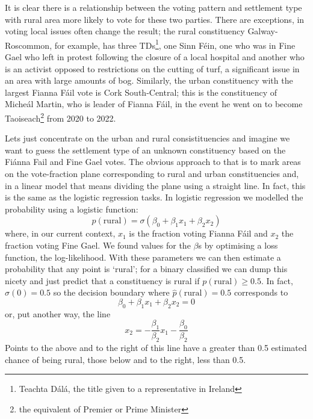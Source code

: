 \documentclass[12pt]{article}
\begin{document}
It is clear there is a relationship between the voting pattern and
settlement type with rural area more likely to vote for these two
parties. There are exceptions, in voting local issues often change the
result; the rural constituency Galway-Roscommon, for example, has
three TDs\footnote{Teachta D\'{a}l\'{a}, the title given to a
representative in Ireland}, one Sinn F\'{e}in, one who was in Fine
Gael who left in protest following the closure of a local hospital and
another who is an activist opposed to restrictions on the cutting of
turf, a significant issue in an area with large amounts of
bog. Similarly, the urban constituency with the largest Fianna
F\'{a}il vote is Cork South-Central; this is the constituency of
Miche\'{a}l Martin, who is leader of Fianna F\'{a}il, in the event he
went on to become Taoiseach\footnote{the equivalent of Premier or Prime
Minister} from 2020 to 2022.

Lets just concentrate on the urban and rural consistituencies and
imagine we want to guess the settlement type of an unknown
constituency based on the Fi\'{a}nna Fail and Fine Gael votes. The
obvious approach to that is to mark areas on the vote-fraction plane
corresponding to rural and urban constituencies and, in a linear model
that means dividing the plane using a straight line. In fact, this is
the same as the logistic regression tasks. In logistic regression we
modelled the probability using a logistic function:
\begin{equation}
  p(\text{rural})=\sigma(\beta_0+\beta_1x_1+\beta_2x_2)
\end{equation}
where, in our current context, $x_1$ is the fraction voting Fianna
F\'{a}il and $x_2$ the fraction voting Fine Gael. We found values for
the $\beta$s by optimising a loss function, the log-likelihood. With
these parameters we can then estimate a probability that any point is
`rural'; for a binary classified we can dump this nicety and just
predict that a constituency is rural if $p(\text{rural})\ge 0.5$. In
fact, $\sigma(0)=0.5$ so the decision boundary where
$\hat{p}(\text{rural})=0.5$ corresponds to
\begin{equation}
  \beta_0+\beta_1x_1+\beta_2x_2=0
\end{equation}
or, put another way, the line
\begin{equation}
  x_2=-\frac{\beta_1}{\beta_2}x_1-\frac{\beta_0}{\beta_2}
\end{equation}
Points to the above and to the right of this line have a greater than
0.5 estimated chance of being rural, those below and to the right,
less than 0.5.
\end{document}
